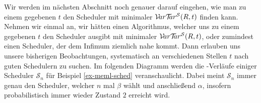 \documentclass[a4paper]{article}
\theoremstyle{nonumberplain}
\begin{document}
	Wir werden im nächsten Abschnitt noch genauer darauf eingehen, wie man zu einem gegebenen $t$ den Scheduler mit minimaler \vt{} $\mathcal{V}\!ar \mathcal{T}\!\!ar^{\mathcal{S}}(R,t)$ finden kann.
	Nehmen wir einmal an, wir hätten einen Algorithmus, welcher uns zu einem gegebenen $t$ den Scheduler ausgibt mit minimaler \vt{} $\mathcal{V}\!ar \mathcal{T}\!\!ar^{\mathcal{S}}(R,t)$, oder zumindest einen Scheduler, der dem Infimum ziemlich nahe kommt. Dann erlauben uns unsere bisherigen Beobachtungen, systematisch an verschiedenen Stellen $t$ nach guten Schedulern zu suchen. Im folgenden Diagramm werden die \vt{}-Verläufe einiger Scheduler $\mathcal{S}_n$ für Beispiel \ref{ex-meml-sched} veranschaulicht. Dabei meint $\mathcal{S}_n$ immer genau den Scheduler, welcher $n$ mal $\beta$ wählt und anschließend $\alpha$, insofern probabilistisch immer wieder Zustand $2$ erreicht wird.
	
\end{document}

